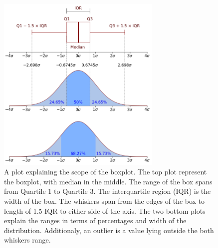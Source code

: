 \begin{figure}[H]
\centering
\includegraphics[width=0.7\textwidth]{figures/chapter4/surrogates/Boxplot_vs_PDF.png}
\caption{A plot explaining the scope of the boxplot. The top plot represent the boxplot, with median in the middle. The range of the box spans from Quartile 1 to Quartile 3. The interquartile region (IQR) is the width of the box. The whiskers span from the edges of the box to length of 1.5 IQR to either side of the axis.
  The two bottom plots explain the ranges in terms of percentages and width of the distribution. Additionaly, an outlier is a value lying outside the both whiskers range. }
\label{fig:boxplot}
\end{figure}

